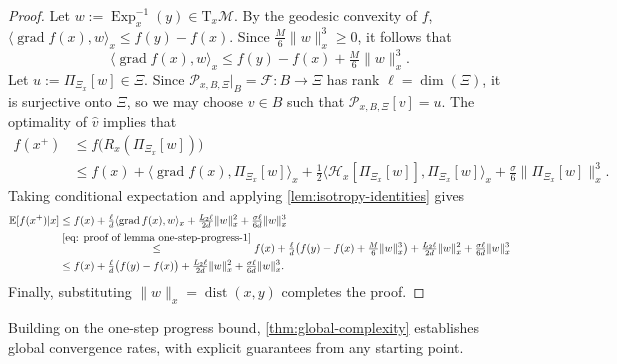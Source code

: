 \documentclass[final,onefignum,onetabnum]{siamart250211}
\DeclareMathOperator{\grad}{grad}
\DeclareMathOperator{\Exp}{Exp}
\begin{document}
  \begin{proof}
  
  Let $w := \Exp_x^{-1}(y) \in \mathrm{T}_x \mathcal{M}$.
  By the geodesic convexity of $f$, $\langle \grad f(x),w\rangle_x\le f(y)-f(x)$. Since $\tfrac{M}{6}\|w\|_x^{3}\ge 0$, it follows that
  \begin{equation}
  \label{eq: proof of lemma one-step-progress-1}
  \langle \grad f(x),w\rangle_x \leq f(y) - f(x) + \tfrac{M}{6}\|w\|_x^{3}.
  \end{equation}
  Let $u:=\Pi_{\Xi_x}[w]\in \Xi$. Since $\mathcal{P}_{x,B,\Xi}|_{B}=\mathcal{F}:B\to\Xi$ has rank $\ell=\dim(\Xi)$, it is surjective onto $\Xi$, so we may choose $v\in B$ such that $\mathcal{P}_{x,B,\Xi}[v]=u$.
  The optimality of $\hat v$ implies that
  \[
  \begin{aligned}
  f(x^{+})
  &\le f\big(R_x(\Pi_{\Xi_x}[w])\big)\\
  &\le f(x)
    +\langle \grad f(x),\Pi_{\Xi_x}[w]\rangle_x
    +\tfrac{1}{2}\langle \mathcal{H}_x[\Pi_{\Xi_x}[w]],\Pi_{\Xi_x}[w]\rangle_x
    +\tfrac{\sigma}{6}\|\Pi_{\Xi_x}[w]\|_x^{3}.
  \end{aligned}
  \]
  Taking conditional expectation and applying \cref{lem:isotropy-identities} gives
  \[
  \begin{aligned}
  \mathbb{E} [ f(x^{+}) | x]
    &\leq f(x)
      +\tfrac{\ell}{d}\langle \grad f(x), w\rangle_x
      +\tfrac{L_2 \ell}{2d}\|w\|_x^{2}
      +\tfrac{\sigma \ell}{6d}\|w\|_x^{3} \\
    &\overset{\eqref{eq: proof of lemma one-step-progress-1}}{\leq} f(x)+\tfrac{\ell}{d}\big(f(y)-f(x) + \tfrac{M}{6}\|w\|_x^{3}\big)  +\tfrac{L_2 \ell}{2d}\|w\|_x^{2}
    +\tfrac{\sigma \ell}{6d}\|w\|_x^{3} \\
    &\leq f(x)+\tfrac{\ell}{d}\big(f(y)-f(x)\big)+\tfrac{L_2 \ell}{2d}\|w\|_x^{2}+\tfrac{\sigma \ell}{6d}\|w\|_x^{3}.
  \end{aligned}
  \]
  Finally, substituting $\|w\|_x=\operatorname{dist}(x,y)$ completes the proof.
  \end{proof}
Building on the one-step progress bound, \cref{thm:global-complexity} establishes global convergence rates, with explicit guarantees from any starting point.
\end{document}
